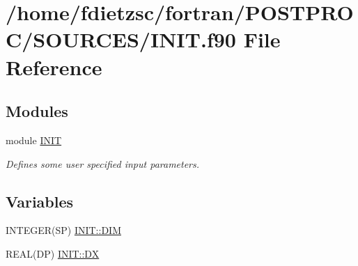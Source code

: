 \hypertarget{INIT_8f90}{
\section{/home/fdietzsc/fortran/POSTPROC/SOURCES/INIT.f90 File Reference}
\label{INIT_8f90}
}
\subsection*{Modules}
\begin{DoxyCompactItemize}
\item 
module \hyperlink{namespaceINIT}{INIT}


\begin{DoxyCompactList}\small\item\em Defines some user specified input parameters. \end{DoxyCompactList}

\end{DoxyCompactItemize}
\subsection*{Variables}
\begin{DoxyCompactItemize}
\item 
INTEGER(SP) \hyperlink{namespaceINIT_a0220cec3830356e24c2d71461783251b}{INIT::DIM}
\item 
REAL(DP) \hyperlink{namespaceINIT_a2408b167edb7d420e8c30e9844d9f657}{INIT::DX}
\end{DoxyCompactItemize}
